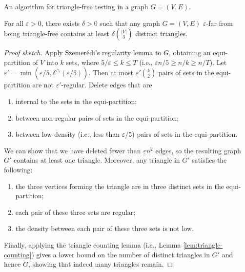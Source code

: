 \documentclass[letterpaper, reqno,11pt]{article}
\begin{document}
\begin{algorithm}[h]
  \Accept
  \caption{An algorithm for triangle-free testing in a graph $G = (V, E)$.}
  \label{alg:triangle-free}
\end{algorithm}

\begin{theorem}
  For all $\varepsilon > 0$, there exists $\delta > 0$ such that any graph $G = (V, E)$ $\varepsilon$-far from being triangle-free contains at least $\delta\binom{|V|}{3}$ distinct triangles.
\end{theorem}

\begin{proof}[Proof sketch]
  Apply Szemer\'edi's regularity lemma to $G$, obtaining an equi-partition of $V$ into $k$ sets, where $5/\varepsilon \leq k \leq T$ (i.e., $\varepsilon n/5 \geq n/k \geq n/T$). Let $\varepsilon' = \min(\varepsilon/5, \delta^\triangle(\varepsilon/5))$. Then at most $\varepsilon' \binom{k}{2}$ pairs of sets in the equi-partition are not $\varepsilon'$-regular. Delete edges that are
  \begin{enumerate}[label=(\roman*), itemsep=0pt]
    \item internal to the sets in the equi-partition;
    \item between non-regular pairs of sets in the equi-partition;
    \item between low-density (i.e., less than $\varepsilon/5$) pairs of sets in the equi-partition.
  \end{enumerate}
  We can show that we have deleted fewer than $\varepsilon n^2$ edges, so the resulting graph $G'$ contains at least one triangle. Moreover, any triangle in $G'$ satisfies the following:
  \begin{enumerate}[label=(\roman*), itemsep=0pt]
    \item the three vertices forming the triangle are in three distinct sets in the equi-partition;
    \item each pair of these three sets are regular;
    \item the density between each pair of these three sets is not low.
  \end{enumerate}
  Finally, applying the triangle counting lemma (i.e., Lemma \ref{lem:triangle-counting}) gives a lower bound on the number of distinct triangles in $G'$ and hence $G$, showing that indeed many triangles remain.
\end{proof}
\end{document}

